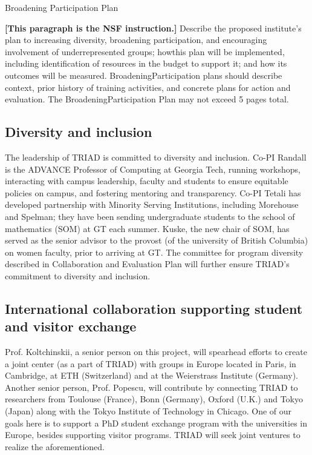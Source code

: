\documentclass[12pt]{article}
\newcommand{\shrink}{\def\baselinestretch{0.90}\large\normalsize}
\begin{document}


\pagestyle{plain}
\normalbaselineskip=10.0pt



\begin{center}
Broadening Participation Plan
\end{center}

{\bf [This paragraph is the NSF instruction.]}
Describe the proposed institute's plan to increasing diversity, broadening participation, and encouraging involvement of underrepresented groups; howthis plan will be implemented, including identification of resources in the budget to support it; and how its outcomes will be measured. BroadeningParticipation plans should describe context, prior history of training activities, and concrete plans for action and evaluation. The BroadeningParticipation Plan may not exceed 5 pages total.


\subsection{Diversity and inclusion}

The leadership of TRIAD is committed to diversity and inclusion.
Co-PI Randall is the ADVANCE Professor of Computing at Georgia Tech, running workshops, interacting with campus leadership, faculty and students to ensure equitable policies on campus, and fostering mentoring and transparency.
Co-PI Tetali has developed partnership with Minority Serving Institutions, including Morehouse and Spelman; they have been sending undergraduate students to the school of mathematics (SOM) at GT each summer.
Kuske, the new chair of SOM, has served as the senior advisor to the provost (of the university of British Columbia) on women faculty, prior to arriving at GT. The committee for program diversity described in Collaboration and Evaluation Plan will further ensure TRIAD's commitment to diversity and inclusion.

\subsection{International collaboration supporting student and visitor exchange}

Prof. Koltchinskii, a senior person on this project, will spearhead efforts to create a joint center (as a part of TRIAD) with groups in Europe located in Paris, in Cambridge, at ETH (Switzerland) and at the Weierstrass Institute (Germany). Another senior person,
Prof. Popescu, will contribute by connecting TRIAD to researchers from Toulouse (France), Bonn (Germany), Oxford (U.K.) and Tokyo (Japan) along with the Tokyo Institute of Technology
in Chicago. One of our goals here is to support a PhD student exchange program with the universities in Europe, besides supporting  visitor programs. TRIAD  will seek joint ventures to realize the aforementioned.
\end{document}
